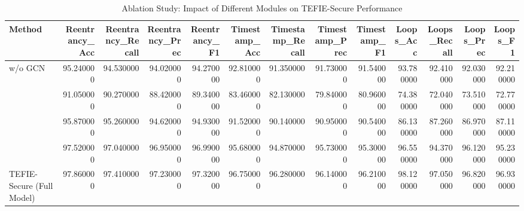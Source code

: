 \begin{table}[t]
\centering
\begin{tabular}{lrrrrrrrrrrrr}
\toprule
Method & Reentrancy_Acc & Reentrancy_Recall & Reentrancy_Prec & Reentrancy_F1 & Timestamp_Acc & Timestamp_Recall & Timestamp_Prec & Timestamp_F1 & Loops_Acc & Loops_Recall & Loops_Prec & Loops_F1 \\
\midrule
w/o GCN & 95.240000 & 94.530000 & 94.020000 & 94.270000 & 92.810000 & 91.350000 & 91.730000 & 91.540000 & 93.780000 & 92.410000 & 92.030000 & 92.210000 \\
 & 91.050000 & 90.270000 & 88.420000 & 89.340000 & 83.460000 & 82.130000 & 79.840000 & 80.960000 & 74.380000 & 72.040000 & 73.510000 & 72.770000 \\
 & 95.870000 & 95.260000 & 94.620000 & 94.930000 & 91.520000 & 90.140000 & 90.950000 & 90.540000 & 86.130000 & 87.260000 & 86.970000 & 87.110000 \\
 & 97.520000 & 97.040000 & 96.950000 & 96.990000 & 95.680000 & 94.870000 & 95.730000 & 95.300000 & 96.550000 & 94.370000 & 96.120000 & 95.230000 \\
TEFIE-Secure (Full Model) & 97.860000 & 97.410000 & 97.230000 & 97.320000 & 96.750000 & 96.280000 & 96.140000 & 96.210000 & 98.120000 & 97.050000 & 96.820000 & 96.930000 \\
\bottomrule
\end{tabular}
\caption{Ablation Study: Impact of Different Modules on TEFIE-Secure Performance}
\label{tab:ablation}
\end{table}
